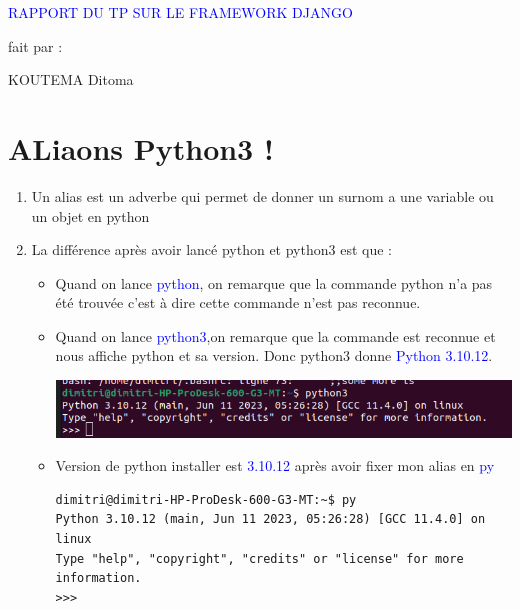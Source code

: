 \documentclass[10pt,a4paper]{article}
\author{KOUTEMA Ditoma}
\begin{document}

\begin{shadedbox}
\begin{center}
\huge \textcolor{blue}{RAPPORT DU TP SUR LE FRAMEWORK DJANGO}
\end{center}
\end{shadedbox}
\large{\begin{center}
fait par : 
\end{center}}
\begin{center}
\huge{KOUTEMA Ditoma}
\end{center}
\newpage
\tableofcontents
\newpage

\section{ALiaons Python3 !}
\begin{enumerate}
\item Un alias est un adverbe qui permet de donner un surnom a une variable ou un objet en python
\item La différence après avoir lancé python et python3 est que :\\
\begin{itemize}

\item Quand on lance \textcolor{blue}{python}, on remarque que la commande python n'a pas été trouvée c'est à dire cette commande n'est pas reconnue.
\item Quand on lance \textcolor{blue}{python3},on remarque que la commande est reconnue et nous affiche python et sa version. Donc python3 donne \textcolor{blue}{Python 3.10.12}.\\
\begin{center}
\includegraphics[scale=0.5]{1.png}\\
\end{center}
\item Version de python installer est \textcolor{blue}{3.10.12} après avoir fixer mon alias en \textcolor{blue}{py}
\begin{verbatim}
dimitri@dimitri-HP-ProDesk-600-G3-MT:~$ py
Python 3.10.12 (main, Jun 11 2023, 05:26:28) [GCC 11.4.0] on linux
Type "help", "copyright", "credits" or "license" for more information.
>>> 
\end{verbatim}
\end{itemize}
\end{enumerate}
\end{document}
